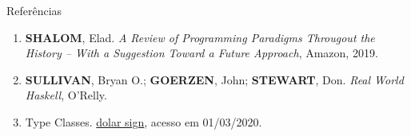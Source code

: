 \begin{frame}[fragile]{Referências}

    \begin{enumerate}
        \item \textbf{SHALOM}, Elad. \textit{A Review of Programming Paradigms Througout the 
            History -- With a Suggestion Toward a Future Approach}, Amazon, 2019.

        \item \textbf{SULLIVAN}, Bryan O.; \textbf{GOERZEN}, John; \textbf{STEWART}, Don. 
            \textit{Real World Haskell}, O'Relly.

        \item Type Classes. \href{https://typeclasses.com/featured/dollar}{dolar sign}, acesso
            em 01/03/2020.
 
    \end{enumerate}

\end{frame}
